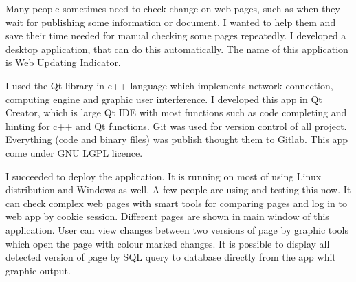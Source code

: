 Many people sometimes need to check change on web pages, such as when they wait for publishing some information or document.
I wanted to help  them and save their time  needed for manual checking some pages repeatedly.
I developed a desktop application, that can do this automatically.
The name of this application is Web Updating  Indicator.

I used the Qt library in c++ language which implements network connection, computing engine and graphic user interference.
I developed this app in Qt Creator, which is large Qt IDE with most functions such as code completing and hinting for c++ and Qt functions.
Git was used for version control of all project.
Everything (code and binary files) was publish thought them to Gitlab.
This app come under GNU LGPL licence.

I succeeded to deploy the application.
It is running on most of using Linux distribution and Windows as well.
A few people are using and testing this now.
It can check complex web pages with smart tools for comparing pages and log in to web app by cookie session. Different pages are shown in main window of this application.
User can view changes between two versions of page by graphic tools which open the page with colour marked changes.
It is possible to display all detected version of page by SQL query to database directly from the app whit graphic output.

